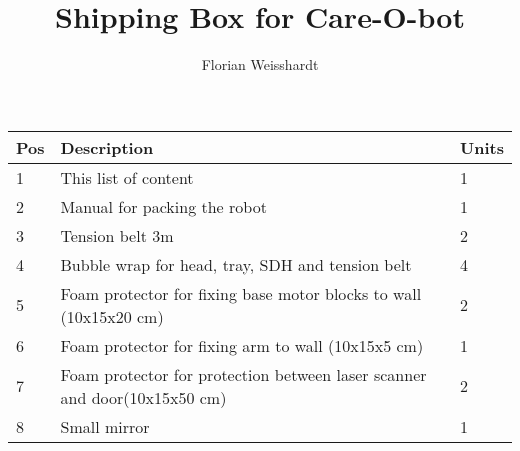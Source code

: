 \documentclass{article}
\title{Shipping Box for Care-O-bot} %
\author{Florian Weisshardt} %
\begin{document}
\maketitle %

\begin{tabular}{|l|l|l|}
\hline
\textbf{Pos} & \textbf{Description} & \textbf{Units}\\
\hline\hline
1 & This list of content & 1\\
2 & Manual for packing the robot & 1\\
3 & Tension belt 3m & 2\\
4 & Bubble wrap for head, tray, SDH and tension belt & 4\\
5 & Foam protector for fixing base motor blocks to wall (10x15x20 cm) & 2\\
6 & Foam protector for fixing arm to wall (10x15x5 cm) & 1\\
7 & Foam protector for protection between laser scanner and door(10x15x50 cm) & 2\\
8 & Small mirror & 1\\
\hline
\end{tabular}
\end{document}
